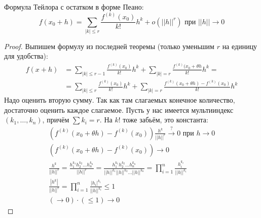 \begin{theorem}
	Формула Тейлора с остатком в форме Пеано:
	\[ f(x_0+h) = \sum_{|k|\le r} \frac{f^{(k)}(x_0)}{k!} h^k + o(||h||^r) \text{~при~} ||h|| \to 0\]
\end{theorem}
\begin{proof}
	Выпишем формулу из последней теоремы (только уменьшим $r$ на единицу для удобства):
	\begin{align*}
		f(x+h) &= \sum_{|k|\le r-1} \frac{f^{(k)}(x_0)}{k!} h^k + \sum_{|k|=r}\frac{f^{(k)}(x_0+\theta h}{k!}h^k = \\
		       &= \sum_{|k|\le r  } \frac{f^{(k)}(x_0)}{k!} h^k + \sum_{|k|=r}\frac{f^{(k)}(x_0+\theta h)-f^{(k)}(x_0)}{k!}h^k
	\end{align*}
	Надо оценить вторую сумму.
	Так как там слагаемых конечное количество, достаточно оценить каждое слагаемое.
	Пусть у нас имеется мультииндекс $(k_1, \dots, k_n)$, причём $\sum k_i = r$.
	На $k!$ тоже забьём, это константа:
	\begin{gather*}
		\left(f^{(k)}(x_0+\theta h) - f^{(k)} (x_0)\right) \frac{h^k}{||h||^r} \stackrel{?}{\to} 0 \text{~при~} h \to 0 \\
		\left(f^{(k)}(x_0+\theta h) - f^{(k)} (x_0)\right) \to 0 \\
		\frac{h^k}{||h||^r}
			= \frac{h_1^{k_1}h_2^{k_2}\dots h_n^{k_n}}{||h||^r}
			= \frac{h_1^{k_1}h_2^{k_2}\dots h_n^{k_n}}{||h||^{k_1}||h||^{k_2}\dots||h||^{k_n}}
			= \prod_{i=1}^{n} \frac{h_i^{k_i}}{||h||^{k_i}} \\
		\frac{|h^k|}{||h||^r}
			= \prod_{i=1}^{n} \frac{|h_i|^{k_i}}{||h||^{k_i}}
			\le 1 \\
		(\to 0) \cdot (\le 1) \to 0
	\end{gather*}
\end{proof}

